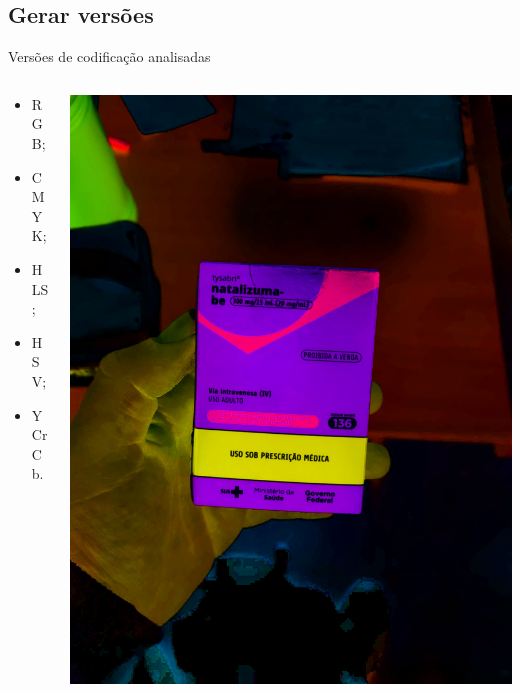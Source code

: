 \subsection{Gerar versões}
\begin{frame}{Versões de codificação analisadas}
	\begin{columns}
		\begin{column}{0.45\textwidth}
			\begin{itemize}
					\item RGB;
					\item CMYK;
					\item HLS;
					\item HSV;
					\item YCrCb.
				\end{itemize}
		\end{column}
		\begin{column}{0.45\textwidth}\centering
			\begin{columns}
				\begin{column}{0.5\textwidth}\centering
					\includegraphics[height=0.3\textheight]{../pictures/tysabri_cmyk.jpg}


\end{column}
\end{columns}
\end{column}
\end{columns}
\end{frame}
